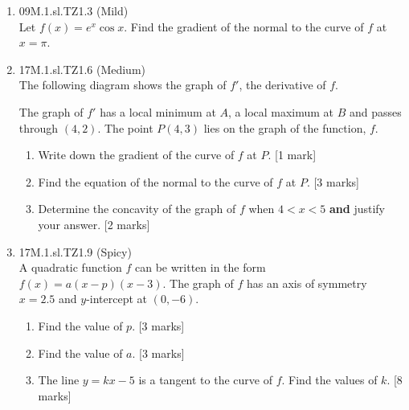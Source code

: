 \documentclass[12pt, twoside]{article}
\begin{document}
\begin{enumerate}
  \item 09M.1.sl.TZ1.3 (Mild)\\
  Let $f(x)=e^{x} \cos x$. Find the gradient of the normal to the curve of $f$ at $x= \pi$.

  \item 17M.1.sl.TZ1.6 (Medium)\\
  The following diagram shows the graph of $f'$, the derivative of $f$.
    \begin{center}
    \end{center}
    The graph of $f'$ has a local minimum at $A$, a local maximum at $B$ and passes through $(4,2)$. The point $P(4,3)$ lies on the graph of the function, $f$.
    \begin{enumerate}
      \item Write down the gradient of the curve of $f$ at $P$. [1 mark]
      \item Find the equation of the normal to the curve of $f$ at $P$. [3 marks]
      \item Determine the concavity of the graph of $f$ when $4<x<5$ \textbf{and} justify your answer. [2 marks]
    \end{enumerate}

    \item 17M.1.sl.TZ1.9 (Spicy)\\
    A quadratic function $f$ can be written in the form  $f(x)=a(x-p)(x-3)$. The graph of $f$ has an axis of symmetry $x=2.5$ and $y$-intercept at $(0,-6)$.
    \begin{enumerate}
      \item Find the value of $p$. [3 marks]
      \item Find the value of $a$. [3 marks]
      \item The line $y=kx-5$ is a tangent to the curve of $f$. Find the values of $k$. [8 marks]
    \end{enumerate}



\end{enumerate}
\end{document}
